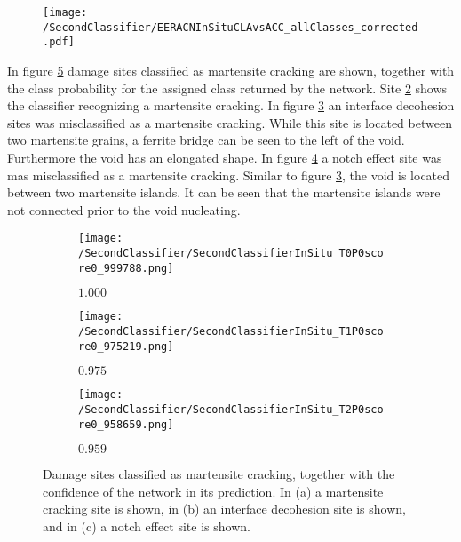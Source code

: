 \begin{figure}
\centering
\texttt{[image: /SecondClassifier/EERACNInSituCLAvsACC\_allClasses\_corrected.pdf]}
\caption{}
\label{fig:SecondClassifierOverallAllClasses}
\end{figure}

In figure \ref{fig:InSituMartensiteSamples} damage sites classified as martensite cracking are shown, together with the class probability for the assigned class returned by the network. Site \ref{sub:InSituMartensiteSamplesM} shows the classifier recognizing a martensite cracking. In figure \ref{sub:InSituMartensiteSamplesI} an interface decohesion sites was misclassified as a martensite cracking. While this site is located between two martensite grains, a ferrite bridge can be seen to the left of the void. Furthermore the void has an elongated shape. In figure \ref{sub:InSituMartensiteSamplesN} a notch effect site was mas misclassified as a martensite cracking. Similar to figure \ref{sub:InSituMartensiteSamplesI}, the void is located between two martensite islands. It can be seen that the martensite islands were not connected prior to the void nucleating.


\begin{figure}[H]
\centering
\begin{subfigure}{0.3\textwidth}
\texttt{[image: /SecondClassifier/SecondClassifierInSitu\_T0P0score0\_999788.png]}
\caption{$1.000$}
\label{sub:InSituMartensiteSamplesM}
\end{subfigure}
\begin{subfigure}{0.3\textwidth}
\texttt{[image: /SecondClassifier/SecondClassifierInSitu\_T1P0score0\_975219.png]}
\caption{$0.975$}
\label{sub:InSituMartensiteSamplesI}
\end{subfigure}
\begin{subfigure}{0.3\textwidth}
\texttt{[image: /SecondClassifier/SecondClassifierInSitu\_T2P0score0\_958659.png]}
\caption{$0.959$}
\label{sub:InSituMartensiteSamplesN}
\end{subfigure}
\caption{Damage sites classified as martensite cracking, together with the confidence of the network in its prediction. In (a) a martensite cracking site is shown, in (b) an interface decohesion site is shown, and in (c) a notch effect site is shown. }
\label{fig:InSituMartensiteSamples}
\end{figure}

